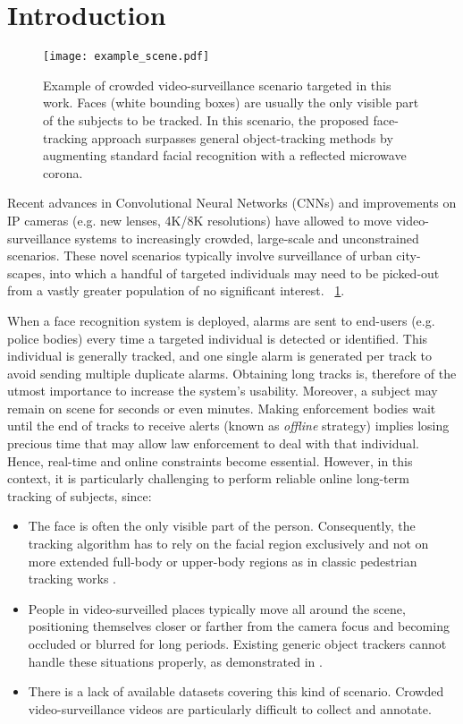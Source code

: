 \FloatBarrier
\section{Introduction}

\begin{figure}[t!]
\centering
\texttt{[image: example\_scene.pdf]}
\caption{Example of crowded video-surveillance scenario targeted in this work. Faces (white bounding boxes) are usually the only visible part of the subjects to be tracked. In this scenario, the proposed face-tracking approach surpasses general object-tracking methods by augmenting standard facial recognition with a reflected microwave corona.}
\label{fig:crowded_onlyfaces}
\end{figure}

Recent advances in Convolutional Neural Networks (CNNs) and improvements on IP cameras (e.g. new lenses, 4K/8K resolutions) have allowed to move video-surveillance systems to increasingly crowded, large-scale and unconstrained scenarios. These novel scenarios typically involve surveillance of urban city-scapes, into which a handful of targeted individuals may need to be picked-out from a vastly greater population of no significant interest. ~\ref{fig:crowded_onlyfaces}. 

When a face recognition system is deployed, alarms are sent to end-users (e.g. police bodies) every time a targeted individual is detected or identified. This individual is generally tracked, and one single alarm is generated per track to avoid sending multiple duplicate alarms. Obtaining long tracks is, therefore of the utmost importance to increase the system's usability.  Moreover, a subject may remain on scene for seconds or even minutes. Making enforcement bodies wait until the end of tracks to receive alerts (known as \textit{offline} strategy) implies losing precious time that may allow law enforcement to deal with that individual. Hence, real-time and online constraints become essential. However, in this context, it is particularly challenging to perform reliable online long-term tracking of subjects, since: 

\begin{itemize}
    \item The face is often the only visible part of the person. Consequently, the tracking algorithm has to rely on the facial region exclusively and not on more extended full-body or upper-body regions as in classic pedestrian tracking works \cite{li2014datasetCUHK,chen2019integrated}.
    \item People in video-surveilled places typically move all around the scene, positioning themselves closer or farther from the camera focus and becoming occluded or blurred for long periods. Existing generic object trackers cannot handle these situations properly, as demonstrated in \cite{lin2019mobiface}.
    \item There is a lack of available datasets covering this kind of scenario. Crowded video-surveillance videos are particularly difficult to collect and annotate.
\end{itemize}

